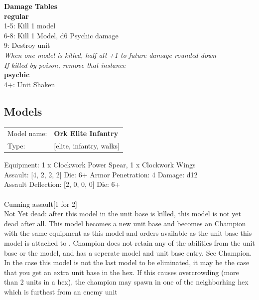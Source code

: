 {\bf Damage Tables} \\
 {\bf regular } \\
1-5: Kill 1 model \\
6-8: Kill 1 Model, d6 Psychic damage \\
9: Destroy unit \\
{{\it When one model is killed, half all +1 to future damage rounded down}} \\
{{\it If killed by poison, remove that instance}} \\
 {\bf psychic } \\
4+: Unit Shaken \\


\clearpage

\subsection{ Models }

\begin{tabular}{ll}
Model name: & {\bf Ork Elite Infantry } \\
Type: & [elite, infantry, walks] \\
\end{tabular}

Equipment: 1 x Clockwork Power Spear, 1 x Clockwork Wings \\

Assault: [4, 2, 2, 2] Die: 6+ Armor Penetration: 4 Damage: d12 \\
Assault Deflection: [2, 0, 0, 0] Die: 6+\\
\\ 
Cunning assault[1 for 2]\\ 
 

Not Yet dead: after this model in the unit base is killed, this model is not yet dead after all. This model becomes a new unit base and becomes an Champion with the same equipment as this model and orders available as the unit base this model is attached to . Champion does not retain any of the abilities from the unit base or the model, and has a seperate model and unit base entry. See Champion. In the case this model is not the last model to be eliminated, it may be the case that you get an extra unit base in the hex. If this causes overcrowding (more than 2 units in a hex), the champion may spawn in one of the neighborhing hex which is furthest from an enemy unit\\ 



